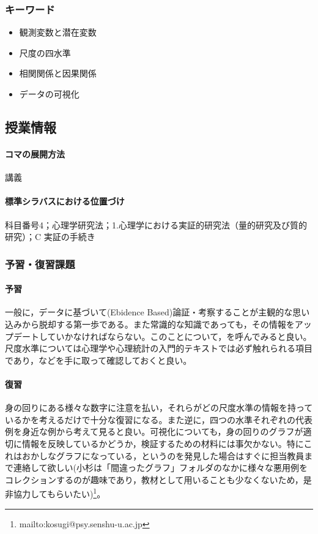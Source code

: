 \subsubsection{キーワード}
\begin{itemize}
\item 観測変数と潜在変数
\item 尺度の四水準
\item 相関関係と因果関係
\item データの可視化
\end{itemize}
\subsection{授業情報}
\paragraph{コマの展開方法}
講義
\paragraph{標準シラバスにおける位置づけ}
科目番号4；心理学研究法；1.心理学における実証的研究法（量的研究及び質的研究）；C 実証の手続き
\subsubsection{予習・復習課題}
\paragraph{予習}
一般に，データに基づいて(Ebidence Based)論証・考察することが主観的な思い込みから脱却する第一歩である。また常識的な知識であっても，その情報をアップデートしていかなければならない。このことについて，\citet{Rosling2019}を呼んでみると良い。尺度水準については心理学や心理統計の入門的テキストでは必ず触れられる項目であり，\citet{三浦201705,川端201408,Yamada2004,kosugi2018,kosugi2019}などを手に取って確認しておくと良い。
\paragraph{復習}
身の回りにある様々な数字に注意を払い，それらがどの尺度水準の情報を持っているかを考えるだけで十分な復習になる。また逆に，四つの水準それぞれの代表例を身近な例から考えて見ると良い。可視化についても，身の回りのグラフが適切に情報を反映しているかどうか，検証するための材料には事欠かない。特にこれはおかしなグラフになっている，というのを発見した場合はすぐに担当教員まで連絡して欲しい(小杉は「間違ったグラフ」フォルダのなかに様々な悪用例をコレクションするのが趣味であり，教材として用いることも少なくないため，是非協力してもらいたい)\footnote{mailto:kosugi@psy.senshu-u.ac.jp}。
